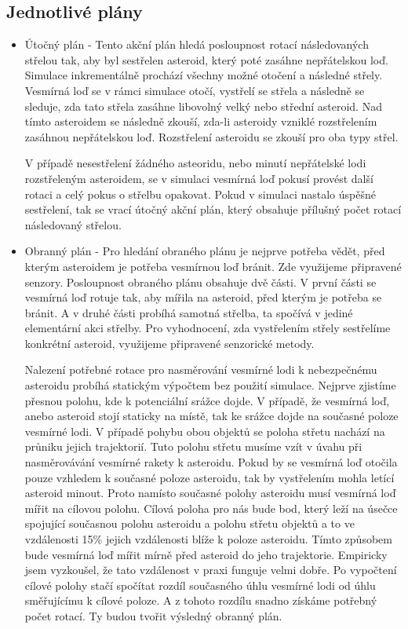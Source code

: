 \subsection{Jednotlivé plány}
\begin{itemize}
    \item Útočný plán - 
        Tento akční plán hledá posloupnost rotací následovaných střelou tak, aby byl sestřelen asteroid, který poté zasáhne nepřátelskou loď.        
        Simulace inkrementálně prochází všechny možné otočení a následné střely. Vesmírná loď se v rámci simulace otočí, vystřelí se střela a následně se sleduje, zda tato střela zasáhne libovolný velký nebo střední asteroid.
        Nad tímto asteroidem se následně zkouší, zda-li asteroidy vzniklé rozstřelením zasáhnou nepřátelskou loď. Rozstřelení asteroidu se zkouší pro oba typy střel.
        \par
        V případě nesestřelení žádného asteoridu, nebo minutí nepřátelské lodi rozstřeleným asteroidem, se v simulaci vesmírná loď pokusí provést další rotaci a celý pokus o střelbu opakovat.
        Pokud v simulaci nastalo úspěšné sestřelení, tak se vrací útočný akční plán, který obsahuje přílušný počet rotací následovaný střelou.
    
    \item Obranný plán - Pro hledání obraného plánu je nejprve potřeba vědět, před kterým asteroidem je potřeba vesmírnou loď bránit. 
        Zde využijeme připravené senzory. Posloupnost obraného plánu obsahuje dvě části. V první části se vesmírná loď rotuje tak, aby mířila na asteroid, před kterým je potřeba se bránit.
        A v druhé části probíhá samotná střelba, ta spočívá v jediné elementární akci střelby. Pro vyhodnocení, zda vystřelením střely sestřelíme konkrétní asteroid, využijeme připravené senzorické metody.
        \par
        Nalezení potřebné rotace pro nasměrování vesmírné lodi k nebezpečnému asteroidu probíhá statickým výpočtem bez použití simulace.
        Nejprve zjistíme přesnou polohu, kde k potenciální srážce dojde. V případě, že vesmírná loď, anebo asteroid stojí staticky na místě, tak ke srážce dojde na současné poloze vesmírné lodi.
        V případě pohybu obou objektů se poloha střetu nachází na průniku jejich trajektorií. Tuto polohu střetu musíme vzít v úvahu při nasměrovávání vesmírné rakety k asteroidu.        
        Pokud by se vesmírná loď otočila pouze vzhledem k současné poloze asteroidu, tak by vystřelením mohla letící asteroid minout.
        Proto namísto současné polohy asteroidu musí vesmírná loď mířit na cílovou polohu.
        Cílová poloha pro nás bude bod, který leží na úsečce spojující současnou polohu asteroidu a polohu střetu objektů a to ve vzdálenosti 15\% jejich vzdálenosti blíže k poloze asteroidu. 
        Tímto způsobem bude vesmírná loď mířit mírně před asteroid do jeho trajektorie. Empiricky jsem vyzkoušel, že tato vzdálenost v praxi funguje velmi dobře.
        Po vypočtení cílové polohy stačí spočítat rozdíl současného úhlu vesmírné lodi od úhlu směřujícímu k cílové poloze. A z tohoto rozdílu snadno získáme potřebný počet rotací. Ty budou tvořit výsledný obranný plán.
        

\end{itemize}
